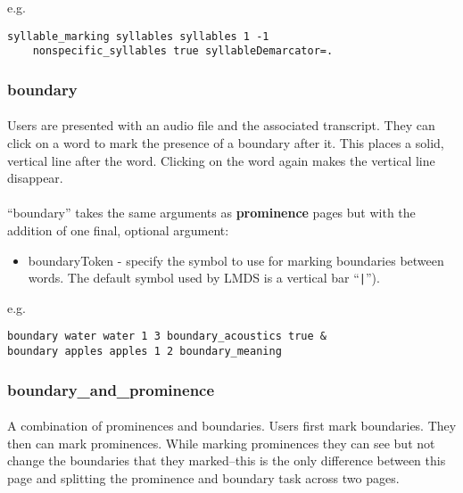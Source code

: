 e.g.
\begin{lstlisting}
syllable_marking syllables syllables 1 -1 
	nonspecific_syllables true syllableDemarcator=.
\end{lstlisting}

\subsubsection{boundary}

\paragraph{}
Users are presented with an audio file and the associated transcript.  They can click on a word to mark the presence of a boundary after it.  This places a solid, vertical line after the word.  Clicking on the word again makes the vertical line disappear.

\paragraph{}
``boundary'' takes the same arguments as \textbf{prominence} pages but with the addition of one final, optional argument:

\begin{itemize}
\item boundaryToken - specify the symbol to use for marking boundaries between words.  The default symbol used by LMDS is a vertical bar ``\texttt{|}'').
\end{itemize}

e.g.

\begin{lstlisting}
boundary water water 1 3 boundary_acoustics true &
boundary apples apples 1 2 boundary_meaning
\end{lstlisting}


\subsubsection{boundary\_and\_prominence}

\paragraph{}
A combination of prominences and boundaries.  Users first mark boundaries.  They then can mark prominences.  While marking prominences they can see but not change the boundaries that they marked--this is the only difference between this page and splitting the prominence and boundary task across two pages.

